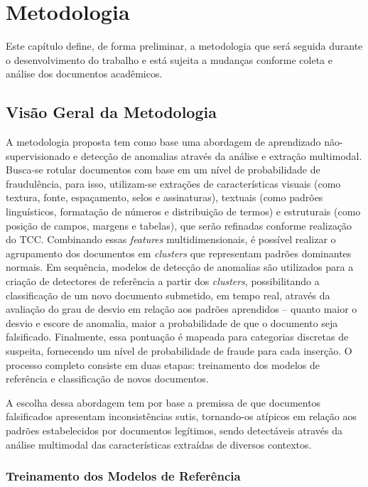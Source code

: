 \chapter{Metodologia}

Este capítulo define, de forma preliminar, a metodologia que será seguida durante o desenvolvimento do trabalho e está sujeita a mudanças conforme coleta e análise dos documentos acadêmicos.

\section{Visão Geral da Metodologia}

A metodologia proposta tem como base uma abordagem de aprendizado não-supervisionado e detecção de anomalias através da análise e extração multimodal. Busca-se rotular documentos com base em um nível de probabilidade de fraudulência, para isso, utilizam-se extrações de características visuais (como textura, fonte, espaçamento, selos e assinaturas), textuais (como padrões linguísticos, formatação de números e distribuição de termos) e estruturais (como posição de campos, margens e tabelas), que serão refinadas conforme realização do TCC. Combinando essas \textit{features} multidimensionais, é possível realizar o agrupamento dos documentos em \textit{clusters} que representam padrões dominantes normais. Em sequência, modelos de detecção de anomalias são utilizados para a criação de detectores de referência a partir dos \textit{clusters}, possibilitando a classificação de um novo documento submetido, em tempo real, através da avaliação do grau de desvio em relação aos padrões aprendidos -- quanto maior o desvio e escore de anomalia, maior a probabilidade de que o documento seja falsificado. Finalmente, essa pontuação é mapeada para categorias discretas de suspeita, fornecendo um nível de probabilidade de fraude para cada inserção. O processo completo consiste em duas etapas: treinamento dos modelos de referência e classificação de novos documentos.

A escolha dessa abordagem tem por base a premissa de que documentos falsificados apresentam inconsistências sutis, tornando-os atípicos em relação aos padrões estabelecidos por documentos legítimos, sendo detectáveis através da análise multimodal das características extraídas de diversos contextos.

\subsection{Treinamento dos Modelos de Referência}

